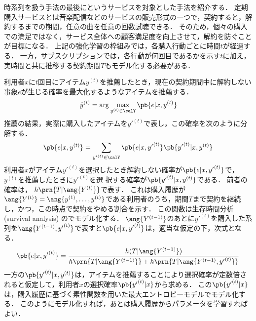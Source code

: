 時系列を扱う手法の最後にというサービスを対象とした手法を紹介する\cite{kdd:06:02}．
定期購入サービスとは音楽配信などのサービスの販売形式の一つで，契約すると，解約するまでの期間，任意の曲を任意の回数試聴できる．
そのため，個々の購入での満足ではなく，サービス全体への顧客満足度を向上させて，解約を防ぐことが目標になる．
上記の強化学習の枠組みでは，各購入行動ごとに時間$t$が経過する．
一方，サブスクリプションでは，各行動が何回目であるかを示す$t$に加え，実時間と共に推移する契約期間$T$もモデル化する必要がある．

利用者$x$に$t$回目にアイテム$y^{(t)}$を推薦したとき，現在の契約期間中に解約しない事象$e$が生じる確率を最大化するようなアイテムを推薦する．
\[
 \hat{y}^{(t)}=\arg\max_{y^{(t)}\in\calY}\pb{e|x,y^{(t)}}
\]
推薦の結果，実際に購入したアイテムを${y'}^{(t)}$で表し，この確率を次のように分解する．
\[
\pb{e|x,y^{(t)}}=
\sum_{{y'}^{(t)}\in\calY}
\pb{e|x,{y'}^{(t)}} \pb{{y'}^{(t)}|x,y^{(t)}}
\]
利用者$x$がアイテム${y'}^{(t)}$を選択したとき解約しない確率が$\pb{e|x,{y'}^{(t)}}$で，$y^{(t)}$を推薦したときに${y'}^{(t)}$を選
択する確率が$\pb{{y'}^{(t)}|x,y^{(t)}}$である．
前者の確率は， $h\prn{T|\ang{Y^{(t)}}}$で表す．
これは購入履歴が$\ang{Y^{(t)}}=\ang{y^{(1)},\dotsc,y^{(t)}}$である利用者のうち，期間$T$まで契約を継続し，かつ，この時点で契約をやめる割合を示す．
この関数は生存時間分析 (survival analysis) のでモデル化する．
$\ang{Y^{(t-1)}}$のあとに${y'}^{(t)}$を購入した系列を$\ang{Y^{(t-1)},{y'}^{(t)}}$で表すと$\pb{e|x,{y'}^{(t)}}$は，適当な仮定の下，次式となる．
\[
\pb{e|x,{y'}^{(t)}}=
\frac{h(T|\ang{Y^{(t-1)}})}{h\prn{T|\ang{Y^{(t-1)}}}+h\prn{T|\ang{Y^{(t-1)},{y'}^{(t)}}}}
\]
一方の$\pb{{y'}^{(t)}|x,y^{(t)}}$は，アイテムを推薦することにより選択確率が定数倍されると仮定して，利用者$x$の選択確率$\pb{{y'}^{(t)}|x}$から求める．
この$\pb{{y'}^{(t)}|x}$は，購入履歴に基づく素性関数を用いた最大エントロピーモデルでモデル化する．
このようにモデル化すれば，あとは購入履歴からパラメータを学習すればよい．

